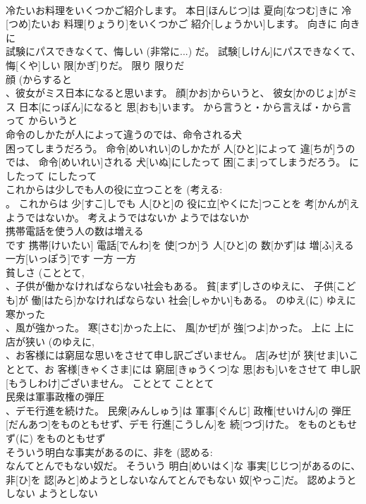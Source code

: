 \documentclass[8pt]{extreport}
\begin{document}
\begin{CJK}{UTF8}{min}
\\	冷たいお料理をいくつかご紹介します。	本日[ほんじつ]は 夏向[なつむ]きに 冷[つめ]たいお 料理[りょうり]をいくつかご 紹介[しょうかい]します。	向きに	向きに	
\\	試験にパスできなくて、悔しい (非常に...) だ。	試験[しけん]にパスできなくて、 悔[くや]しい 限[かぎ]りだ。	限り	限りだ	
\\	顔 (からすると 
\\	、彼女がミス日本になると思います。	顔[かお]からいうと、 彼女[かのじょ]がミス 日本[にっぽん]になると 思[おも]います。	から言うと・から言えば・から言って	からいうと	
\\	命令のしかたが人によって違うのでは、命令される犬 
\\	困ってしまうだろう。	命令[めいれい]のしかたが 人[ひと]によって 違[ちが]うのでは、 命令[めいれい]される 犬[いぬ]にしたって 困[こま]ってしまうだろう。	にしたって	にしたって	
\\	これからは少しでも人の役に立つことを (考える: 
\\	。	これからは 少[すこ]しでも 人[ひと]の 役に立[やくにた]つことを 考[かんが]えようではないか。	考えようではないか	ようではないか	
\\	携帯電話を使う人の数は増える 
\\	です	携帯[けいたい] 電話[でんわ]を 使[つか]う 人[ひと]の 数[かず]は 増[ふ]える 一方[いっぽう]です	一方	一方	
\\	貧しさ (こととて, 
\\	、子供が働かなければならない社会もある。	貧[まず]しさのゆえに、 子供[こども]が 働[はたら]かなければならない 社会[しゃかい]もある。	のゆえ(に)	ゆえに	
\\	寒かった 
\\	、風が強かった。	寒[さむ]かった上に、 風[かぜ]が 強[つよ]かった。	上に	上に	
\\	店が狭い (のゆえに, 
\\	、お客様には窮屈な思いをさせて申し訳ございません。	店[みせ]が 狭[せま]いこととて、お 客様[きゃくさま]には 窮屈[きゅうくつ]な 思[おも]いをさせて 申し訳[もうしわけ]ございません。	こととて	こととて	
\\	民衆は軍事政権の弾圧 
\\	、デモ行進を続けた。	民衆[みんしゅう]は 軍事[ぐんじ] 政権[せいけん]の 弾圧[だんあつ]をものともせず、デモ 行進[こうしん]を 続[つづ]けた。	をものともせず(に)	をものともせず	
\\	そういう明白な事実があるのに、非を (認める: 
\\	なんてとんでもない奴だ。	そういう 明白[めいはく]な 事実[じじつ]があるのに、 非[ひ]を 認[みと]めようとしないなんてとんでもない 奴[やっこ]だ。	認めようとしない	ようとしない	

\end{CJK}
\end{document}

